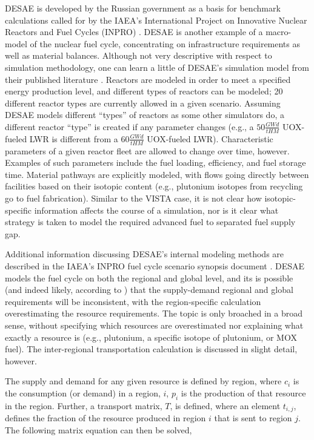DESAE is developed by the Russian government as a basis for benchmark
calculations called for by the IAEA's International Project on Innovative
Nuclear Reactors and Fuel Cycles (INPRO)
\cite{_international_2009,andrianova_desae_2008}. DESAE is another example of a
macro-model of the nuclear fuel cycle, concentrating on infrastructure
requirements as well as material balances. Although not very descriptive with
respect to simulation methodology, one can learn a little of DESAE's simulation
model from their published literature \cite{andrianova_desae_2008}. Reactors are
modeled in order to meet a specified energy production level, and different
types of reactors can be modeled; 20 different reactor types are currently
allowed in a given scenario. Assuming DESAE models different ``types'' of
reactors as some other simulators do, a different reactor ``type'' is created if
any parameter changes (e.g., a $50 \frac{GW d}{tHM}$ UOX-fueled LWR is different
from a $60 \frac{GW d}{tHM}$ UOX-fueled LWR). Characteristic parameters of a
given reactor fleet are allowed to change over time, however. Examples of such
parameters include the fuel loading, efficiency, and fuel storage time. Material
pathways are explicitly modeled, with flows going directly between facilities
based on their isotopic content (e.g., plutonium isotopes from recycling go to
fuel fabrication). Similar to the VISTA case, it is not clear how
isotopic-specific information affects the course of a simulation, nor is it
clear what strategy is taken to model the required advanced fuel to separated
fuel supply gap.

Additional information discussing DESAE's internal modeling methods are
described in the IAEA's INPRO fuel cycle scenario synopsis document
\cite{iaea_nuclear_2010}.  DESAE models the fuel cycle on both the regional and
global level, and its is possible (and indeed likely, according to
\cite{iaea_nuclear_2010}) that the supply-demand regional and global
requirements will be inconsistent, with the region-specific calculation
overestimating the resource requirements. The topic is only broached in a broad
sense, without specifying which resources are overestimated nor explaining what
exactly a resource is (e.g., plutonium, a specific isotope of plutonium, or MOX
fuel). The inter-regional transportation calculation is discussed in slight
detail, however.

The supply and demand for any given resource is defined by region, where $c_i$
is the consumption (or demand) in a region, $i$, $p_i$ is the production of that
resource in the region. Further, a transport matrix, $T$, is defined, where an
element $t_{i,j}$, defines the fraction of the resource produced in region $i$
that is sent to region $j$. The following matrix equation can then be solved,

